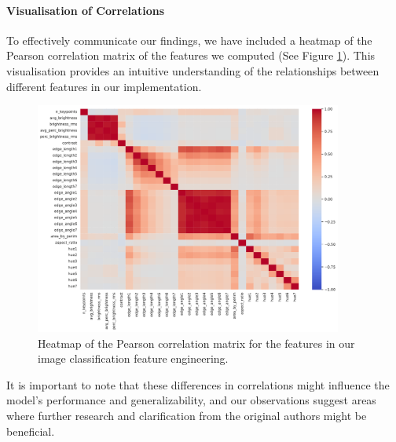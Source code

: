 \paragraph{Visualisation of Correlations}
To effectively communicate our findings, we have included a heatmap of the Pearson correlation matrix of the features we computed (See Figure \ref{fig:correlation_matrix}). This visualisation provides an intuitive understanding of the relationships between different features in our implementation.





\begin{figure}[h]
    \centering
	\includegraphics[width=0.9\textwidth]{report/figures/cv_corr_matrix1.pdf}
	\caption{Heatmap of the Pearson correlation matrix for the features in our image classification feature engineering.}
	\label{fig:correlation_matrix}
\end{figure}

It is important to note that these differences in correlations might influence the model's performance and generalizability, and our observations suggest areas where further research and clarification from the original authors might be beneficial.

